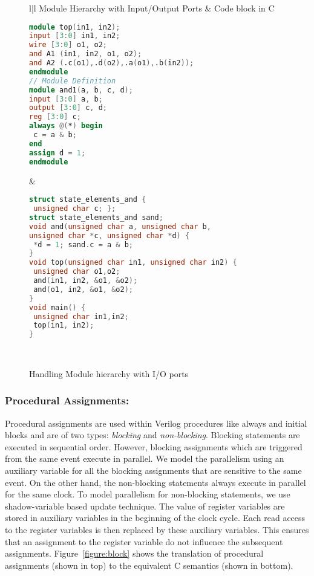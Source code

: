 \begin{figure*}[htbp]
\scriptsize
\begin{tabular}{l|l}
\hline
Module Hierarchy with Input/Output Ports &  Code block in C \\
\hline
\begin{lstlisting}[mathescape=true,language=Verilog]
module top(in1, in2);
input [3:0] in1, in2;
wire [3:0] o1, o2;
and A1 (in1, in2, o1, o2);
and A2 (.c(o1),.d(o2),.a(o1),.b(in2));
endmodule
// Module Definition              
module and1(a, b, c, d);
input [3:0] a, b;
output [3:0] c, d;
reg [3:0] c;
always @(*) begin
 c = a & b;
end
assign d = 1;
endmodule
\end{lstlisting}
&
\begin{lstlisting}[mathescape=true,language=C]
struct state_elements_and {
 unsigned char c; };
struct state_elements_and sand;
void and(unsigned char a, unsigned char b, 
unsigned char *c, unsigned char *d) {
 *d = 1; sand.c = a & b;
}
void top(unsigned char in1, unsigned char in2) {
 unsigned char o1,o2;
 and(in1, in2, &o1, &o2);
 and(o1, in2, &o1, &o2);
}
void main() {
 unsigned char in1,in2;
 top(in1, in2);
}    
\end{lstlisting}
\\
\hline
\end{tabular}
\caption{Handling Module hierarchy with I/O ports}
\label{figure:module-hierarchy}
\end{figure*}

\subsubsection{Procedural Assignments:}
Procedural assignments are used within Verilog 
procedures like always and initial blocks and are of 
two types: \emph{blocking} and \emph{non-blocking}.  
Blocking statements are executed 
in sequential order. However, blocking
assignments which are triggered from the same event execute
in parallel.  We model the parallelism using an auxiliary variable
for all the blocking assignments that are sensitive to the same event. 
On the other hand, the non-blocking statements always 
execute in parallel for the same clock. To model 
parallelism for non-blocking statements, we 
use shadow-variable based update technique. 
The value of register variables are stored in 
auxiliary variables in the beginning of the clock cycle.  
Each read access to the register variables is then replaced 
by these auxiliary variables. This ensures that 
an assignment to the register variable do not influence the 
subsequent assignments. Figure~\ref{figure:block} shows 
the translation of procedural assignments (shown in top) to 
the equivalent C semantics (shown in bottom).     

